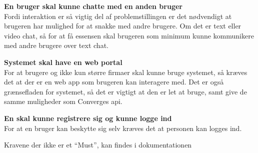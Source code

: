 \textbf{En bruger skal kunne chatte med en anden bruger} \\
Fordi interaktion er så vigtig del af problemstillingen er det nødvendigt at brugeren har mulighed for at snakke med andre brugere. Om det er text eller video chat, så for at få essensen skal brugeren som minimum kunne kommunikere med andre brugere over text chat.

\textbf{Systemet skal have en web portal} \\
For at brugere og ikke kun større firmaer skal kunne bruge systemet, så kræves det at der er en web app som brugeren kan interagere med. Det er også grænsefladen for systemet, så det er vigtigt at den er let at bruge, samt give de samme muligheder som Converges api.

\textbf{En skal kunne registrere sig og kunne logge ind} \\
For at en bruger kan beskytte sig selv kræves det at personen kan logges ind.

Kravene der ikke er et ``Must'', kan findes i dokumentationen 